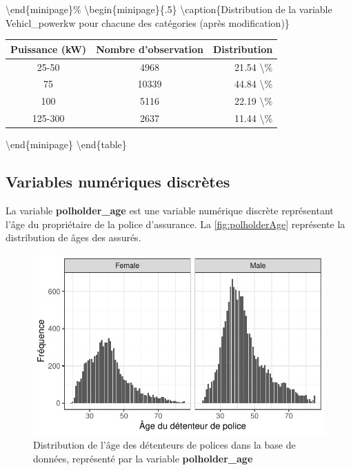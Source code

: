 \documentclass[
]{article}
\begin{document}
\textbackslash{}end\{minipage\}\%
\textbackslash{}begin\{minipage\}\{.5\linewidth\} \centering
\textbackslash{}caption\{Distribution de la variable Vehicl\_powerkw
pour chacune des catégories (après modification)\}

\begin{tabular}{ccr}
\toprule
Puissance (kW) & Nombre d'observation & Distribution\\
\midrule
25-50 & 4968 & 21.54 \textbackslash{}\%\\
75 & 10339 & 44.84 \textbackslash{}\%\\
100 & 5116 & 22.19 \textbackslash{}\%\\
125-300 & 2637 & 11.44 \textbackslash{}\%\\
\bottomrule
\end{tabular}

\textbackslash{}end\{minipage\} \textbackslash{}end\{table\}

\newpage

\hypertarget{variables-numuxe9riques-discruxe8tes}{%
\subsection{Variables numériques
discrètes}\label{variables-numuxe9riques-discruxe8tes}}

La variable \textbf{polholder\_age} est une variable numérique discrète
représentant l'âge du propriétaire de la police d'assurance. La
\autoref{fig:polholderAge} représente la distribution de âges des
assurés.

\begin{figure}

{\centering \includegraphics{01-Rapport_files/figure-latex/graph_polholder_age-1} 

}

\caption{\label{fig:polholderAge}Distribution de l'âge des détenteurs de polices dans la base de données, représenté par la variable \textbf{polholder\_age}}\label{fig:graph_polholder_age}
\end{figure}
\end{document}
